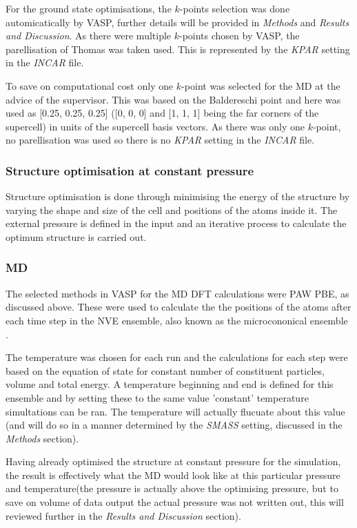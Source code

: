 \documentclass[a4paper,12pt]{article}
\begin{document}
For the ground state optimisations, the $k$-points selection was done automicatically by VASP, further details will be provided in \textit{Methods} and \textit{Results and Discussion}. As there were multiple $k$-points chosen by VASP, the parellisation of Thomas was taken used. This is represented by the \textit{KPAR} setting in the \textit{INCAR} file.

To save on computational cost only one $k$-point was selected for the MD at the advice of the supervisor. This was based on the Baldereschi point \cite{Baldereschi} and here was used as [0.25, 0.25, 0.25] ([0, 0, 0] and [1, 1, 1] being the far corners of the supercell) in units of the supercell basis vectors. As there was only one $k$-point, no parellisation was used so there is no \textit{KPAR} setting in the \textit{INCAR} file.

\subsubsection{Structure optimisation at constant pressure}

Structure optimisation is done through minimising the energy of the structure by varying the shape and size of the cell and positions of the atoms inside it. The external pressure is defined in the input and an iterative process to calculate the optimum structure is carried out. 

\subsubsection{MD}

The selected methods in VASP for the MD DFT calculations were PAW PBE, as discussed above. These were used to calculate the the positions of the atoms after each time step in the NVE ensemble, also known as the microcononical ensemble \cite{GTherm}.

The temperature was chosen for each run and the calculations for each step were based on the equation of state for constant number of constituent particles, volume and total energy. A temperature beginning and end is defined for this ensemble and by setting these to the same value 'constant' temperature simultations can be ran. The temperature will actually flucuate about this value (and will do so in a manner determined by the \textit{SMASS} setting, discussed in the \textit{Methods} section).

Having already optimised the structure at constant pressure for the simulation, the result is effectively what the MD would look like at this particular pressure and temperature(the pressure is actually above the optimising pressure, but to save on volume of data output the actual pressure was not written out, this will reviewed further in the \textit{Results and Discussion} section).
\end{document}
